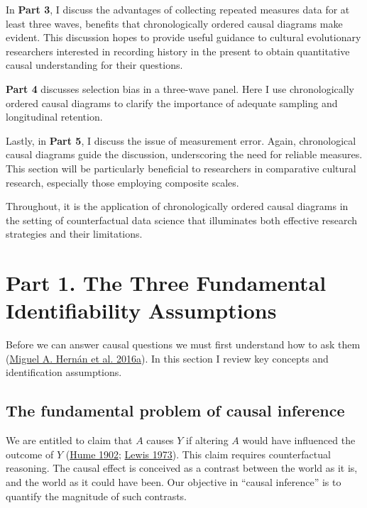 \documentclass[
  singlecolumn]{report}
\begin{document}
In \textbf{Part 3}, I discuss the advantages of collecting repeated
measures data for at least three waves, benefits that chronologically
ordered causal diagrams make evident. This discussion hopes to provide
useful guidance to cultural evolutionary researchers interested in
recording history in the present to obtain quantitative causal
understanding for their questions.

\textbf{Part 4} discusses selection bias in a three-wave panel. Here I
use chronologically ordered causal diagrams to clarify the importance of
adequate sampling and longitudinal retention.

Lastly, in \textbf{Part 5}, I discuss the issue of measurement error.
Again, chronological causal diagrams guide the discussion, underscoring
the need for reliable measures. This section will be particularly
beneficial to researchers in comparative cultural research, especially
those employing composite scales.

Throughout, it is the application of chronologically ordered causal
diagrams in the setting of counterfactual data science that illuminates
both effective research strategies and their limitations.

\hypertarget{part-1.-the-three-fundamental-identifiability-assumptions}{%
\section{Part 1. The Three Fundamental Identifiability
Assumptions}\label{part-1.-the-three-fundamental-identifiability-assumptions}}

Before we can answer causal questions we must first understand how to
ask them (\protect\hyperlink{ref-hernuxe1n2016b}{Miguel A. Hernán et al.
2016a}). In this section I review key concepts and identification
assumptions.

\hypertarget{the-fundamental-problem-of-causal-inference}{%
\subsection{The fundamental problem of causal
inference}\label{the-fundamental-problem-of-causal-inference}}

We are entitled to claim that \(A\) causes \(Y\) if altering \(A\) would
have influenced the outcome of \(Y\)
(\protect\hyperlink{ref-hume1902}{Hume 1902};
\protect\hyperlink{ref-lewis1973}{Lewis 1973}). This claim requires
counterfactual reasoning. The causal effect is conceived as a contrast
between the world as it is, and the world as it could have been. Our
objective in ``causal inference'' is to quantify the magnitude of such
contrasts.
\end{document}
